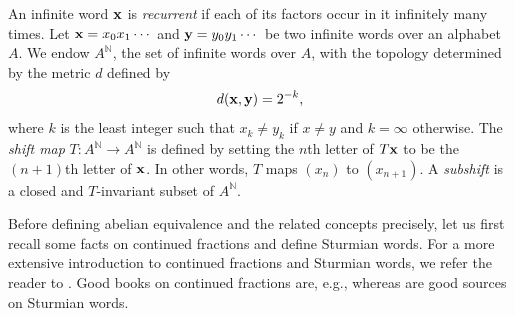 \documentclass[a4paper,fleqn]{article}
\newcommand{\infw}[1]{%
  \ifcat\noexpand#1\relax\bm{#1}%
  \else\mathbf{#1}\fi}          %
\newcommand{\N}{\mathbb{N}}
\begin{document}
  An infinite word $\infw{x}$ is \emph{recurrent} if each of its factors occur in it infinitely many times. Let
  $\infw{x} = x_0 x_1 \cdots$ and $\infw{y} = y_0 y_1 \cdots$ be two infinite words over an alphabet $A$. We endow
  $A^\N$, the set of infinite words over $A$, with the topology determined by the metric $d$ defined by
  \begin{equation*}
    d(\infw{x}, \infw{y}) = 2^{-k},
  \end{equation*}
  where $k$ is the least integer such that $x_k \neq y_k$ if $x \neq y$ and $k = \infty$ otherwise. The \emph{shift
  map} $T\colon A^\N \to A^\N$ is defined by setting the $n$th letter of $T\infw{x}$ to be the $(n+1)$th letter of
  $\infw{x}$. In other words, $T$ maps $(x_n)$ to $(x_{n+1})$. A \emph{subshift} is a closed and $T$-invariant subset
  of $A^\N$.
  
  Before defining abelian equivalence and the related concepts precisely, let us first recall some facts on continued
  fractions and define Sturmian words. For a more extensive introduction to continued fractions and Sturmian words, we
  refer the reader to \cite[Ch.~4]{diss:jarkko_peltomaki}. Good books on continued fractions are, e.g.,
  \cite{1979:an_introduction_to_the_theory_of_numbers,1997:continued_fractions} whereas
  \cite{2002:algebraic_combinatorics_on_words,2002:substitutions_in_dynamics_arithmetics_and_combinatorics} are good
  sources on Sturmian words.
\end{document}
